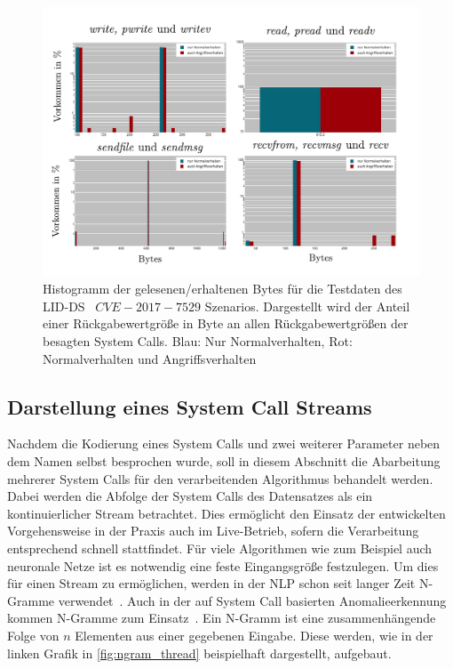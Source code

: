                     \begin{figure}[ht]
                        \centering
                        \includegraphics[width=\textwidth]{images/return_2017_plot.pdf}
                        \caption[Histogramm der geschriebenen und gelesenen Bytewerte]{Histogramm der gelesenen/erhaltenen Bytes für die Testdaten des \ac{LID-DS}~\cite{LID-DS} $CVE-2017-7529$ Szenarios.
                        Dargestellt wird der Anteil einer Rückgabewertgröße in Byte an allen Rückgabewertgrößen der besagten System Calls.
                        Blau: Nur Normalverhalten, Rot: Normalverhalten und Angriffsverhalten}
                        \label{fig:return_values}
                    \end{figure}

        \subsection{Darstellung eines System Call Streams}\label{sec:streamdarstellung}
            Nachdem die Kodierung eines System Calls und zwei weiterer Parameter neben dem Namen selbst besprochen wurde, soll in diesem Abschnitt die Abarbeitung mehrerer System Calls für den verarbeitenden Algorithmus behandelt werden.
            Dabei werden die Abfolge der System Calls des Datensatzes als ein kontinuierlicher Stream betrachtet.
            Dies ermöglicht den Einsatz der entwickelten Vorgehensweise in der Praxis auch im Live-Betrieb, sofern die Verarbeitung entsprechend schnell stattfindet.
            Für viele Algorithmen wie zum Beispiel auch neuronale Netze ist es notwendig eine feste Eingangsgröße festzulegen.
            Um dies für einen Stream zu ermöglichen, werden in der \ac{NLP} schon seit langer Zeit N-Gramme verwendet~\cite{NGRAMSUEN1979}.
            Auch in der auf System Call basierten Anomalieerkennung kommen N-Gramme zum Einsatz~\cite{STIDE_Alternatives, SYSCALL_GRAPHS, IDSTHREADGRIMMER2021}.
            Ein N-Gramm ist eine zusammenhängende Folge von $n$ Elementen aus einer gegebenen Eingabe.
            Diese werden, wie in der linken Grafik in \autoref{fig:ngram_thread} beispielhaft dargestellt, aufgebaut.\par\medskip

